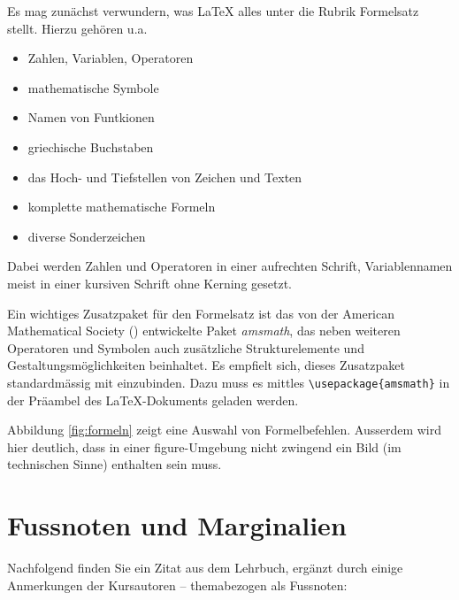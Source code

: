 \documentclass[11pt, a4paper]{article}
\newcommand{\ltx}{\LaTeX}
\let\oldmarginpar\marginpar
\renewcommand{\marginpar}[1]{\oldmarginpar{\textit{#1}}}
\begin{document}
Es mag zunächst verwundern, was \ltx{} alles unter die Rubrik Formelsatz stellt. Hierzu gehören u.a.
\begin{itemize}
\item Zahlen, Variablen, Operatoren
\item mathematische Symbole
\item Namen von Funtkionen
\item griechische Buchstaben
\item das Hoch- und Tiefstellen von Zeichen und Texten
\item komplette mathematische Formeln
\item diverse Sonderzeichen
\end{itemize}

Dabei werden Zahlen und Operatoren in einer aufrechten Schrift, Variablennamen meist in einer kursiven Schrift ohne Kerning gesetzt.

Ein wichtiges Zusatzpaket für den Formelsatz ist das von der American Mathematical Society (\AmS) entwickelte Paket \textit{amsmath}, das neben weiteren Operatoren und Symbolen auch zusätzliche Strukturelemente und Gestaltungsmöglichkeiten beinhaltet. Es empfielt sich, dieses Zusatzpaket standardmässig mit einzubinden. Dazu muss es mittles \verb+\usepackage{amsmath}+ in der Präambel des \ltx-Dokuments geladen werden.

Abbildung \ref{fig:formeln} zeigt eine Auswahl von Formelbefehlen. Ausserdem wird hier deutlich, dass in einer figure-Umgebung nicht zwingend ein Bild (im technischen Sinne) enthalten sein muss.

\clearpage %

\section{Fussnoten und Marginalien}

Nachfolgend finden Sie ein Zitat aus dem Lehrbuch, ergänzt durch einige Anmerkungen der Kursautoren -- themabezogen als Fussnoten\marginpar{Fussnoten}:
\end{document}
